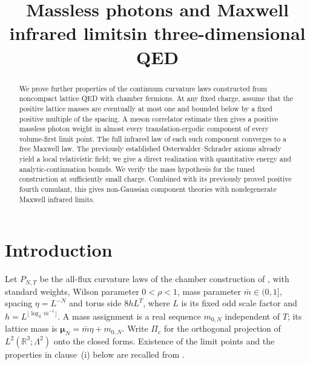 \documentclass[11pt,letterpaper,reqno]{amsart}
\theoremstyle{definition}
\begin{document}
\title[Massless photons and Maxwell infrared limits]{Massless photons and Maxwell infrared limits\newline in three-dimensional QED}
\date{}
\begin{abstract}
We prove further properties of the continuum curvature laws constructed
from noncompact lattice QED with chamber fermions. At any fixed charge,
assume that the positive lattice masses are eventually at most one and
bounded below by a fixed positive multiple of the spacing. A meson
correlator estimate then gives a positive massless photon weight in
almost every translation-ergodic component of every volume-first limit
point. The full infrared law of each such component converges to a free
Maxwell law. The previously established Osterwalder--Schrader axioms
already yield a local relativistic field; we give a direct
realization with quantitative energy and analytic-continuation bounds.
We verify the mass hypothesis for the tuned construction at sufficiently
small charge. Combined with its previously proved positive fourth
cumulant, this gives non-Gaussian component theories with nondegenerate
Maxwell infrared limits.
\end{abstract}
\maketitle
\tableofcontents

\section*{Introduction}

Let $P_{N,T}$ be the all-flux curvature laws of the chamber construction of
\cite{QEDConstruction}, with standard weights, Wilson parameter $0<\rho<1$,
mass parameter $\bar m\in(0,1]$, spacing $\eta=L^{-N}$ and torus side
$8hL^T$, where $L$ is its fixed odd scale factor and
$h=L^{\lfloor\log_L\bar m^{-1}\rfloor}$.
A mass assignment is a real sequence $m_{0,N}$ independent of $T$;
its lattice mass is $\boldsymbol\mu_N=\bar m\eta+m_{0,N}$.
Write $\Pi_{\mathrm c}$ for the orthogonal projection of
$L^2(\mathbb R^3;\Lambda^2)$ onto the closed forms.
Existence of the limit points and the properties in clause~(i) below
are recalled from \cite[Section~6, Section~7.5, and Theorem~8.6]{QEDConstruction}.
\end{document}
